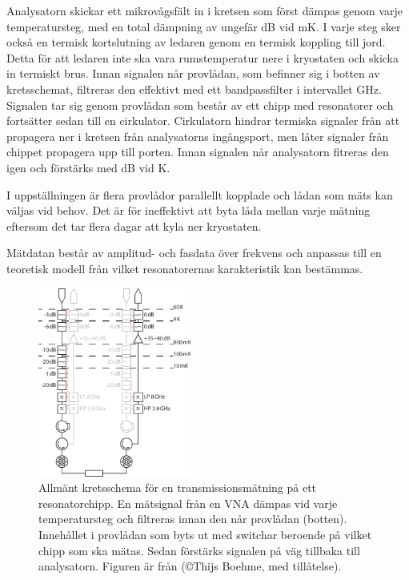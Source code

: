 \documentclass[main.tex]{subfiles}
\begin{document}
Analysatorn skickar ett mikrovågsfält in i kretsen som först dämpas genom varje temperatursteg, med en total dämpning av ungefär \unit[67]{dB} vid \unit[10]{mK}. I varje steg sker också en termisk kortslutning av ledaren genom en termisk koppling till jord. Detta för att ledaren inte ska vara rumstemperatur nere i kryostaten och skicka in termiskt brus. Innan signalen når provlådan, som befinner sig i botten av kretsschemat, filtreras den effektivt med ett bandpassfilter i intervallet \unit[4-8]{GHz}. Signalen tar sig genom provlådan som består av ett chipp med resonatorer och fortsätter sedan till en cirkulator. Cirkulatorn hindrar termiska signaler från att propagera ner i kretsen från analysatorns ingångsport, men låter signaler från chippet propagera upp till porten. Innan signalen når analysatorn fitreras den igen och förstärks med \unit[35-40]{dB} vid \unit[4]{K}.

I uppställningen är flera provlådor parallellt kopplade och lådan som mäts kan väljas vid behov. Det är för ineffektivt att byta låda mellan varje mätning eftersom det tar flera dagar att kyla ner kryostaten.

Mätdatan består av amplitud- och fasdata över frekvens och anpassas till en teoretisk modell från vilket resonatorernas karakteristik kan bestämmas.

\begin{figure}[H]
    \centering
    \includegraphics[width=0.45\textwidth]{figure/kretsar/cryo.pdf}
    \caption{Allmänt kretsschema för en transmissionsmätning på ett resonatorchipp.
    En mätsignal från en VNA dämpas vid varje temperatursteg och filtreras innan den når provlådan (botten). Innehållet i provlådan som byts ut med switchar beroende på vilket chipp som ska mätas. Sedan förstärks signalen på väg tillbaka till analysatorn. Figuren är från \cite[fig. 3.7]{Boehme2016} (\copyright Thijs Boehme, med tillåtelse).}
    \label{fig:matuppstallning}
\end{figure}
\end{document}
